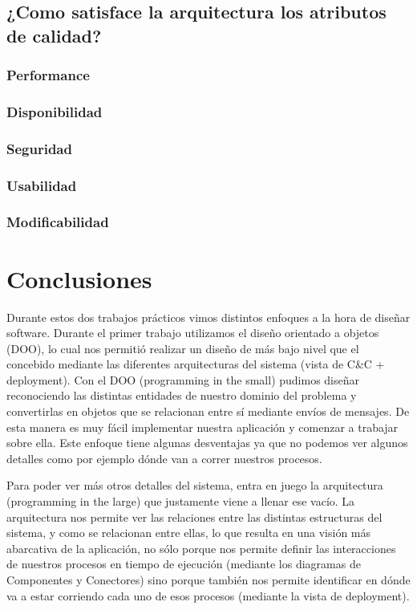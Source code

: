 \documentclass{article}
\theoremstyle{definition}
\theoremstyle{remark}
\begin{document}
\subsection{¿Como satisface la arquitectura los atributos de calidad?}

\subsubsection{Performance}
\subsubsection{Disponibilidad}
\subsubsection{Seguridad}
\subsubsection{Usabilidad}
\subsubsection{Modificabilidad}

\pagebreak

\section{Conclusiones}

Durante estos dos trabajos prácticos vimos distintos enfoques a la hora de diseñar software. Durante el primer trabajo utilizamos el diseño orientado a objetos (DOO), lo cual nos permitió realizar un diseño de más bajo nivel que el concebido mediante las diferentes arquitecturas del sistema (vista de C\&C + deployment). Con el DOO (programming in the small) pudimos diseñar reconociendo las distintas entidades de nuestro dominio del problema y convertirlas en objetos que se relacionan entre sí mediante envíos de mensajes. De esta manera es muy fácil implementar nuestra aplicación y comenzar a trabajar sobre ella. Este enfoque tiene algunas desventajas ya que no podemos ver algunos detalles como por ejemplo dónde van a correr nuestros procesos.

Para poder ver más otros detalles del sistema, entra en juego la arquitectura (programming in the large) que justamente viene a llenar ese vacío. La arquitectura nos permite ver las relaciones entre las distintas estructuras del sistema, y como se relacionan entre ellas, lo que resulta en una visión más abarcativa de la aplicación, no sólo porque nos permite definir las interacciones de nuestros procesos en tiempo de ejecución (mediante los diagramas de Componentes y Conectores) sino porque también nos permite identificar en dónde va a estar corriendo cada uno de esos procesos (mediante la vista de deployment).
\end{document}
